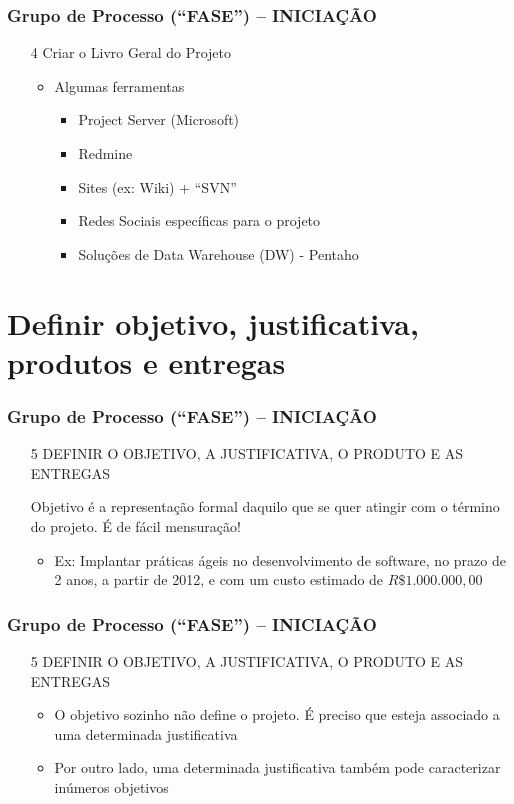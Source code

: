 \begin{frame}
   \frametitle{Grupo de Processo (“FASE”) – INICIAÇÃO}
   \begin{itemize}
    \item[4] Criar o Livro Geral do Projeto
    \begin{itemize}
     \item Algumas ferramentas
     \begin{itemize}
      \item Project Server (Microsoft)
      \item Redmine
      \item Sites (ex: Wiki) + “SVN”
      \item Redes Sociais específicas para o projeto
      \item Soluções de  Data Warehouse (DW) - Pentaho
     \end{itemize}
     \end{itemize}
   \end{itemize}
\end{frame}
\section{Definir objetivo, justificativa, produtos e entregas}
\begin{frame}
   \frametitle{Grupo de Processo (“FASE”) – INICIAÇÃO}
   \begin{itemize}
    \item[5] DEFINIR O OBJETIVO, A JUSTIFICATIVA, O PRODUTO E AS ENTREGAS
    \begin{block}{}
     Objetivo é a representação formal daquilo que se quer atingir com o término do projeto. É de fácil mensuração!
    \end{block}

    \begin{itemize}
     \item Ex: Implantar práticas ágeis no desenvolvimento de software, no prazo de 2 anos, a partir de 2012, e com um custo estimado de $R\$ 1.000.000,00$
   \end{itemize}
   \end{itemize}
\end{frame}

\begin{frame}
   \frametitle{Grupo de Processo (“FASE”) – INICIAÇÃO}
   \begin{itemize}
    \item[5] DEFINIR O OBJETIVO, A JUSTIFICATIVA, O PRODUTO E AS ENTREGAS
      \begin{itemize}
     \item O objetivo sozinho não define o projeto. É preciso que esteja associado a uma determinada justificativa
     \item Por outro lado, uma determinada justificativa também pode caracterizar inúmeros objetivos
   \end{itemize}
   \end{itemize}
\end{frame}

